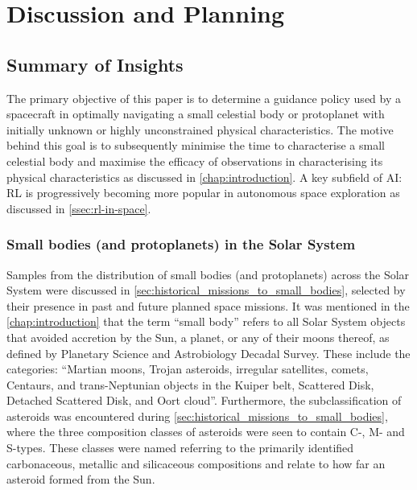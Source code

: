 \chapter{Discussion and Planning}

\section{Summary of Insights}
The primary objective of this paper is to determine a guidance policy used by a spacecraft in optimally navigating a small celestial body or protoplanet with initially unknown or highly unconstrained physical characteristics. The motive behind this goal is to subsequently minimise the time to characterise a small celestial body and maximise the efficacy of observations in characterising its physical characteristics as discussed in \autoref{chap:introduction}. A key subfield of \gls{AI}: \gls{RL} is progressively becoming more popular in autonomous space exploration as discussed in \autoref{ssec:rl-in-space}.

\subsection{Small bodies (and protoplanets) in the Solar System}\label{ssec:insight:small-bodies}

Samples from the distribution of small bodies (and protoplanets) across the Solar System were discussed in \autoref{sec:historical_missions_to_small_bodies}, selected by their presence in past and future planned space missions. It was mentioned in the \autoref{chap:introduction} that the term ``small body'' refers to all Solar System objects that avoided accretion by the Sun, a planet, or any of their moons thereof, as defined by Planetary Science and Astrobiology Decadal Survey. These include the categories: ``Martian moons, Trojan asteroids, irregular satellites, comets, Centaurs, and trans-Neptunian objects in the Kuiper belt, Scattered Disk, Detached Scattered Disk, and Oort cloud''. Furthermore, the subclassification of asteroids was encountered during \autoref{sec:historical_missions_to_small_bodies}, where the three composition classes of asteroids were seen to contain C-, M- and S-types. These classes were named referring to the primarily identified carbonaceous, metallic and silicaceous compositions and relate to how far an asteroid formed from the Sun.


